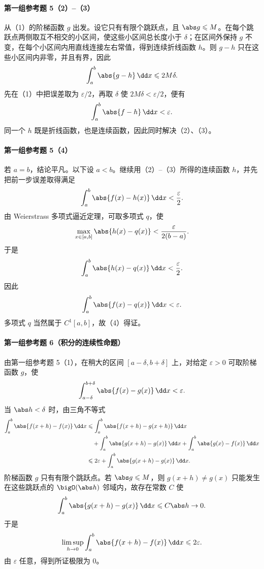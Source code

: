 \paragraph{第一组参考题 5（2）--（3）}
\begin{xsolution}
从（1）的阶梯函数 $g$ 出发。设它只有有限个跳跃点，且 $\abs g\leqslant M$。在每个跳跃点两侧取互不相交的小区间，使这些小区间总长度小于 $\delta$；在区间外保持 $g$ 不变，在每个小区间内用直线连接左右常值，得到连续折线函数 $h$。则 $g-h$ 只在这些小区间内非零，并且有界，因此
\[
  \int_a^b\abs{g-h}\,\dd x\leqslant 2M\delta.
\]
先在（1）中把误差取为 $\varepsilon/2$，再取 $\delta$ 使 $2M\delta<\varepsilon/2$，便有
\[
  \int_a^b\abs{f-h}\,\dd x<\varepsilon.
\]
同一个 $h$ 既是折线函数，也是连续函数，因此同时解决（2）、（3）。
\end{xsolution}

\paragraph{第一组参考题 5（4）}
\begin{xsolution}
若 $a=b$，结论平凡。以下设 $a<b$。继续用（2）--（3）所得的连续函数 $h$，并先把前一步误差取得满足
\[
  \int_a^b\abs{f(x)-h(x)}\,\dd x<\frac\varepsilon2.
\]
由 Weierstrass 多项式逼近定理，可取多项式 $q$，使
\[
  \max_{x\in[a,b]}\abs{h(x)-q(x)}
  <\frac{\varepsilon}{2(b-a)}.
\]
于是
\[
  \int_a^b\abs{h(x)-q(x)}\,\dd x<\frac\varepsilon2.
\]
因此
\[
  \int_a^b\abs{f(x)-q(x)}\,\dd x<\varepsilon.
\]
多项式 $q$ 当然属于 $C^1[a,b]$，故（4）得证。
\end{xsolution}

\paragraph{第一组参考题 6（积分的连续性命题）}
\begin{xsolution}
由第一组参考题 5（1），在稍大的区间 $[a-\delta,b+\delta]$ 上，对给定 $\varepsilon>0$ 可取阶梯函数 $g$，使
\[
  \int_{a-\delta}^{b+\delta}\abs{f(x)-g(x)}\,\dd x<\varepsilon.
\]
当 $\abs h<\delta$ 时，由三角不等式
\begin{align*}
  \int_a^b\abs{f(x+h)-f(x)}\,\dd x
  &\leqslant
  \int_a^b\abs{f(x+h)-g(x+h)}\,\dd x\\
  &\quad+
  \int_a^b\abs{g(x+h)-g(x)}\,\dd x
  +\int_a^b\abs{g(x)-f(x)}\,\dd x\\
  &\leqslant2\varepsilon+
  \int_a^b\abs{g(x+h)-g(x)}\,\dd x.
\end{align*}
阶梯函数 $g$ 只有有限个跳跃点。若 $\abs g\leqslant M$，则 $g(x+h)\ne g(x)$ 只能发生在这些跳跃点的 $\bigO(\abs h)$ 邻域内，故存在常数 $C$ 使
\[
  \int_a^b\abs{g(x+h)-g(x)}\,\dd x\leqslant C\abs h\to0.
\]
于是
\[
  \limsup_{h\to0}\int_a^b\abs{f(x+h)-f(x)}\,\dd x
  \leqslant2\varepsilon.
\]
由 $\varepsilon$ 任意，得到所证极限为 $0$。
\end{xsolution}

